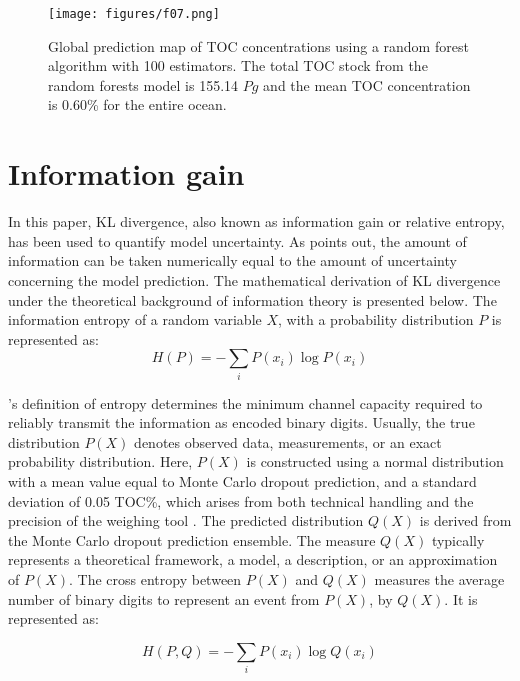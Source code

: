\documentclass[journal abbreviation, manuscript]{copernicus}
\begin{document}
\begin{figure}[!htb]
    \centering
    \texttt{[image: figures/f07.png]}
    \caption{Global prediction map of TOC concentrations using a random forest algorithm with 100 estimators. The total TOC stock from the random forests model is 155.14 $Pg$ and the mean TOC concentration is 0.60\% for the entire ocean.}
    \label{fig:tocPercent_RF}
\end{figure}


\section{Information gain}
\label{appendix:informationgain}
In this paper, KL divergence, also known as information gain or relative entropy, has been used to quantify model uncertainty. As \cite{renyi1961measures} points out, the amount of information can be taken numerically equal to the amount of uncertainty concerning the model prediction. The mathematical derivation of KL divergence under the theoretical background of information theory \citep{shannoninformationgain1948} is presented below. The information entropy of a random variable $X$, with a probability distribution $P$ is represented as: 
\begin{equation}
\label{eq:entropy}
    H(P) = -\sum_i P(x_i) \log P(x_i)
\end{equation}

\cite{shannoninformationgain1948}'s definition of entropy determines the minimum channel capacity required to reliably transmit the information as encoded binary digits. Usually, the true distribution $P(X)$ denotes observed data, measurements, or an exact probability distribution. Here, $P(X)$ is constructed using a normal distribution with a mean value equal to Monte Carlo dropout prediction, and a standard deviation of 0.05 TOC\%, which arises from both technical handling and the precision of the weighing tool \citep{pape2020}. The predicted distribution $Q(X)$ is derived from the Monte Carlo dropout prediction ensemble. The measure $Q(X)$ typically represents a theoretical framework, a model, a description, or an approximation of $P(X)$. The cross entropy between $P(X)$ and $Q(X)$ measures the average number of binary digits to represent an event from $P(X)$, by $Q(X)$. It is represented as:

\begin{equation}
\label{eq:crossentropy}
    H(P, Q) = -\sum_i P(x_i) \log Q(x_i)
\end{equation}
\end{document}

